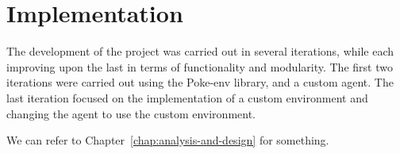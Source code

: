 \chapter{Implementation}
\label{chap:implementation}

The development of the project was carried out in several iterations, while each 
improving upon the last in terms of functionality and modularity.
The first two iterations were carried out using the Poke-env library, and a 
custom agent. The last iteration focused on the implementation of a custom 
environment and changing the agent to use the custom environment.


We can refer to Chapter~\ref{chap:analysis-and-design} for something.




